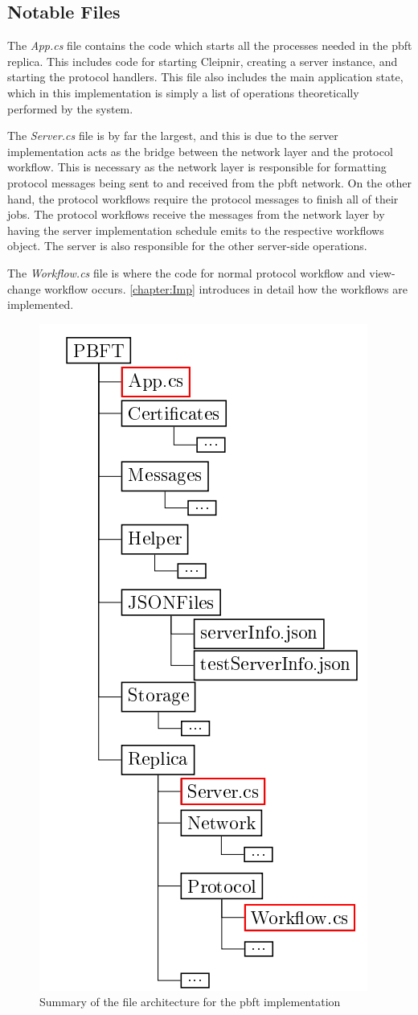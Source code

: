 \subsection{Notable Files}
The \emph{App.cs} file contains the code which starts all the processes needed in the \ac{pbft} replica. This includes code for starting Cleipnir, creating a server instance, and starting the protocol handlers. This file also includes the main application state, which in this implementation is simply a list of operations theoretically performed by the system.

The \emph{Server.cs} file is by far the largest, and this is due to the server implementation acts as the bridge between the network layer and the protocol workflow. This is necessary as the network layer is responsible for formatting protocol messages being sent to and received from the \ac{pbft} network. On the other hand, the protocol workflows require the protocol messages to finish all of their jobs. The protocol workflows receive the messages from the network layer by having the server implementation schedule emits to the respective workflows  object.  The server is also responsible for the other server-side operations.

The \emph{Workflow.cs} file is where the code for normal protocol workflow and view-change workflow occurs. \autoref{chapter:Imp} introduces in detail how the workflows are implemented.
%

\begin{figure}[H]
	\includegraphics[width=0.45\linewidth]{figures/filestructtest}
	\caption{Summary of the file architecture for the \ac{pbft} implementation}
    \label{fig:filestruct}
\end{figure}

